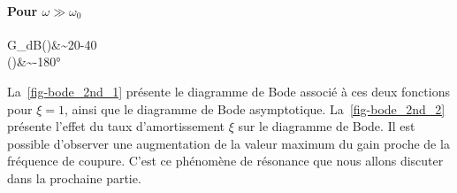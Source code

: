 \paragraph{Pour $\omega \gg\omega_0$}
\begin{bequation}
G_{dB}(\omega)&\sim20-40\log\omega\\
    \phi(\omega)&\sim-180\si{\degree}
\end{bequation}
La~\cref{fig-bode_2nd_1} présente le diagramme de Bode associé à ces deux 
fonctions pour $\xi=1$, ainsi que le diagramme de Bode asymptotique. 
La~\cref{fig-bode_2nd_2} présente l'effet du taux d'amortissement $\xi$ sur 
le diagramme de Bode. Il est possible d'observer une augmentation de la valeur 
maximum du gain proche de la fréquence de coupure.
C'est ce phénomène de résonance que nous allons discuter dans la 
prochaine partie.


